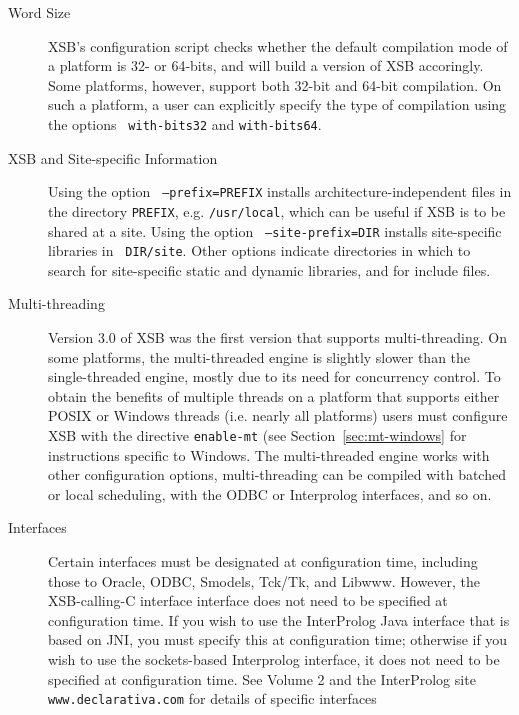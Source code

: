 \begin{description}
\item[Word Size] XSB's configuration script checks whether the default
  compilation mode of a platform is 32- or 64-bits, and will build a
  version of XSB accoringly.  Some platforms, however, support both
  32-bit and 64-bit compilation.  On such a platform, a user can
  explicitly specify the type of compilation using the options {\tt
    with-bits32} and {\tt with-bits64}.  

\item[XSB and Site-specific Information] Using the option {\tt
  --prefix=PREFIX} installs architecture-independent files in the
  directory {\tt PREFIX}, e.g. {\tt /usr/local}, which can be useful
  if XSB is to be shared at a site.  Using the option {\tt
    --site-prefix=DIR} installs site-specific libraries in {\tt
    DIR/site}.  Other options indicate directories in which to search
  for site-specific static and dynamic libraries, and for include
  files.

\item[Multi-threading] Version 3.0 of XSB was the first version that
  supports multi-threading.  On some platforms, the multi-threaded
  engine is slightly slower than the single-threaded engine, mostly
  due to its need for concurrency control.  To obtain the benefits of
  multiple threads on a platform that supports either POSIX or Windows
  threads (i.e.  nearly all platforms) users must configure XSB with
  the directive {\tt enable-mt} (see Section~\ref{sec:mt-windows} for
  instructions specific to Windows. The multi-threaded engine works
  with other configuration options, multi-threading can be compiled
  with batched or local scheduling, with the ODBC or Interprolog
  interfaces, and so on.


\item[Interfaces] Certain interfaces must be designated at
configuration time, including those to Oracle, ODBC, Smodels, Tck/Tk,
and Libwww.  However, the XSB-calling-C interface interface does not
need to be specified at configuration time.  If you wish to use the
InterProlog Java interface that is based on JNI, you must
specify this at configuration time; otherwise if you wish to use the
sockets-based Interprolog interface, it does not need to be specified
at configuration time.  See Volume 2 and the InterProlog site {\tt
www.declarativa.com} for details of specific interfaces


\end{description}
